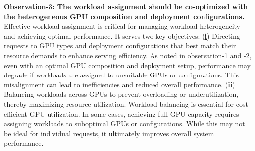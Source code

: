 \textbf{Observation-3: The workload assignment should be co-optimized with the heterogeneous GPU composition and deployment configurations.}
Effective workload assignment is critical for managing workload heterogeneity and achieving optimal performance. It serves two key objectives:
(\underline{\textbf{i}}) Directing requests to GPU types and deployment configurations that best match their resource demands to enhance serving efficiency. As noted in observation-1 and -2, even with an optimal GPU composition and deployment setup, performance may degrade if workloads are assigned to unsuitable GPUs or configurations. This misalignment can lead to inefficiencies and reduced overall performance. (\underline{\textbf{ii}}) Balancing workloads across GPUs to prevent overloading or underutilization, thereby maximizing resource utilization. Workload balancing is essential for cost-efficient GPU utilization. In some cases, achieving full GPU capacity requires assigning workloads to suboptimal GPUs or configurations. While this may not be ideal for individual requests, it ultimately improves overall system performance.


